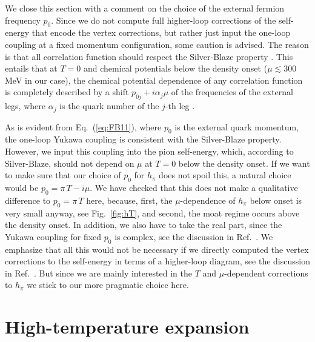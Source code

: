 \documentclass[reprint,english,superscriptaddress,preprintnumbers,amsmath,amssymb,aps,prd]{revtex4-2}
\def\Eq#1{Eq.~(\ref{#1})}
\def\Fig#1{Fig.~\ref{#1}}
\begin{document}
We close this section with a comment on the choice of the external fermion frequency $p_0$.
Since we do not compute full higher-loop corrections of the self-energy that encode the vertex corrections, but rather just input the one-loop coupling at a fixed momentum configuration, some caution is advised. The reason is that all correlation function should respect the Silver-Blaze property \cite{Cohen:2003kd}. This entails that at $T=0$ and chemical potentials below the density onset ($\mu \lesssim 300$\,MeV in our case), the chemical potential dependence of any correlation function is completely described by a shift $p_{0j} + i \alpha_j \mu$ of the frequencies of the external legs, where $\alpha_j$ is the quark number of the $j$-th leg \cite{Marko:2014hea, Khan:2015puu,Fu:2016tey}.

As is evident from \Eq{eq:FB11}, where $p_0$ is the external quark momentum, the one-loop Yukawa coupling is consistent with the Silver-Blaze property. However, we input this coupling into the pion self-energy, which, according to Silver-Blaze, should not depend on $\mu$ at $T=0$ below the density onset. If we want to make sure that our choice of $p_0$ for $h_\pi$ does not spoil this, a natural choice would be $p_0=\pi\,T-i\mu$. We have checked that this does not make a qualitative difference to $p_0=\pi\,T$ here, because, first, the $\mu$-dependence of $h_\pi$ below onset is very small anyway, see \Fig{fig:hT}, and second, the moat regime occurs above the density onset. In addition, we also have to take the real part, since the Yukawa coupling for fixed $p_0$ is complex, see the discussion in Ref.\ \cite{Pawlowski:2014zaa}. We emphasize that all this would not be necessary if we directly computed the vertex corrections to the self-energy in terms of a higher-loop diagram, see the discussion in Ref.\ \cite{Fu:2016tey}. But since we are mainly interested in the $T$ and $\mu$-dependent corrections to $h_\pi$ we stick to our more pragmatic choice here. 


\section{High-temperature expansion}\label{app:HighT}
\end{document}
